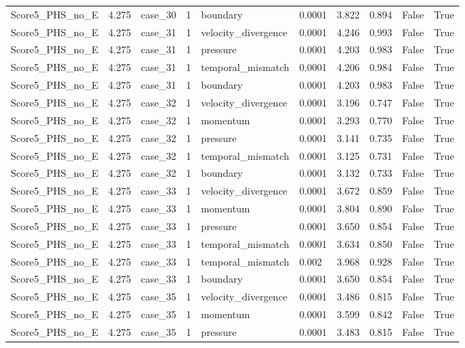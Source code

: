 \begin{longtable}{llllllllll}
Score5\_PHS\_no\_E & 4.275 & case\_30 & 1 & boundary & 0.0001 & 3.822 & 0.894 & False & True \\
Score5\_PHS\_no\_E & 4.275 & case\_31 & 1 & velocity\_divergence & 0.0001 & 4.246 & 0.993 & False & True \\
Score5\_PHS\_no\_E & 4.275 & case\_31 & 1 & pressure & 0.0001 & 4.203 & 0.983 & False & True \\
Score5\_PHS\_no\_E & 4.275 & case\_31 & 1 & temporal\_mismatch & 0.0001 & 4.206 & 0.984 & False & True \\
Score5\_PHS\_no\_E & 4.275 & case\_31 & 1 & boundary & 0.0001 & 4.203 & 0.983 & False & True \\
Score5\_PHS\_no\_E & 4.275 & case\_32 & 1 & velocity\_divergence & 0.0001 & 3.196 & 0.747 & False & True \\
Score5\_PHS\_no\_E & 4.275 & case\_32 & 1 & momentum & 0.0001 & 3.293 & 0.770 & False & True \\
Score5\_PHS\_no\_E & 4.275 & case\_32 & 1 & pressure & 0.0001 & 3.141 & 0.735 & False & True \\
Score5\_PHS\_no\_E & 4.275 & case\_32 & 1 & temporal\_mismatch & 0.0001 & 3.125 & 0.731 & False & True \\
Score5\_PHS\_no\_E & 4.275 & case\_32 & 1 & boundary & 0.0001 & 3.132 & 0.733 & False & True \\
Score5\_PHS\_no\_E & 4.275 & case\_33 & 1 & velocity\_divergence & 0.0001 & 3.672 & 0.859 & False & True \\
Score5\_PHS\_no\_E & 4.275 & case\_33 & 1 & momentum & 0.0001 & 3.804 & 0.890 & False & True \\
Score5\_PHS\_no\_E & 4.275 & case\_33 & 1 & pressure & 0.0001 & 3.650 & 0.854 & False & True \\
Score5\_PHS\_no\_E & 4.275 & case\_33 & 1 & temporal\_mismatch & 0.0001 & 3.634 & 0.850 & False & True \\
Score5\_PHS\_no\_E & 4.275 & case\_33 & 1 & temporal\_mismatch & 0.002 & 3.968 & 0.928 & False & True \\
Score5\_PHS\_no\_E & 4.275 & case\_33 & 1 & boundary & 0.0001 & 3.650 & 0.854 & False & True \\
Score5\_PHS\_no\_E & 4.275 & case\_35 & 1 & velocity\_divergence & 0.0001 & 3.486 & 0.815 & False & True \\
Score5\_PHS\_no\_E & 4.275 & case\_35 & 1 & momentum & 0.0001 & 3.599 & 0.842 & False & True \\
Score5\_PHS\_no\_E & 4.275 & case\_35 & 1 & pressure & 0.0001 & 3.483 & 0.815 & False & True \\

\end{longtable}
